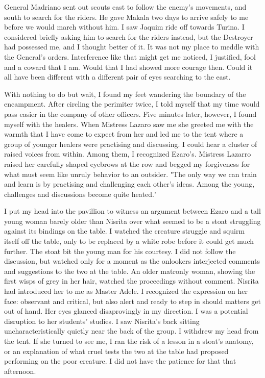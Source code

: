 \documentclass{article}
\begin{document}
General Madriano sent out scouts east to follow the enemy's movements, and south to search for the riders. He gave Makala two days to arrive safely to me before we would march without him. I saw Jaquim ride off towards Turina. I considered briefly asking him to search for the riders instead, but the Destroyer had possessed me, and I thought better of it. It was not my place to meddle with the General's orders. Interference like that might get me noticed, I justified, fool and a coward that I am. Would that I had showed more courage then. Could it all have been different with a different pair of eyes searching to the east.

With nothing to do but wait, I found my feet wandering the boundary of the encampment. After circling the perimiter twice, I told myself that my time would pass easier in the company of other officers. Five minutes later, however, I found myself with the healers. When Mistress Lazaro saw me she greeted me with the warmth that I have come to expect from her and led me to the tent where a group of younger healers were practising and discussing. I could hear a cluster of raised voices from within. Among them, I recognized Ezaro's. Mistress Lazarro raised her carefully shaped eyebrows at the row and begged my forgiveness for what must seem like unruly behavior to an outsider. "The only way we can train and learn is by practising and challenging each other's ideas. Among the young, challenges and discussions become quite heated."

I put my head into the pavillion to witness an argument between Ezaro and a tall young woman barely older than Nisrita over what seemed to be a stoat struggling against its bindings on the table. I watched the creature struggle and squirm itself off the table, only to be replaced by a white robe before it could get much further. The stoat bit the young man for his courtesy. I did not follow the discussion, but watched only for a moment as the onlookers interjected comments and suggestions to the two at the table. An older matronly woman, showing the first wisps of grey in her hair, watched the proceedings without comment. Nisrita had introduced her to me as Master Adele. I recognized the expression on her face: observant and critical, but also alert and ready to step in should matters get out of hand. Her eyes glanced disaprovingly in my direction. I was a potential disruption to her students' studies. I saw Nisrita's back sitting uncharacteristically quietly near the back of the group. I withdrew my head from the tent. If she turned to see me, I ran the risk of a lesson in a stoat's anatomy, or an explanation of what cruel tests the two at the table had proposed performing on the poor creature. I did not have the patience for that that afternoon.
\end{document}
